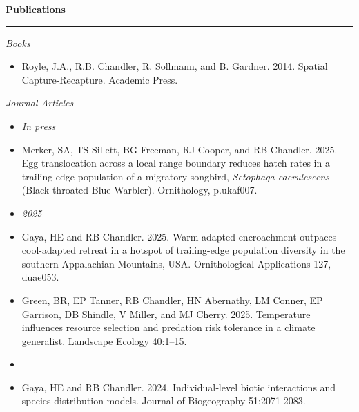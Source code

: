 \documentclass[12pt]{article}
\begin{document}
\vspace{0.5cm}

{\large \bf Publications} \\
\rule[3mm]{\textwidth}{0.3mm}

\emph{Books}
\begin{itemize}

\item Royle, J.A., R.B. Chandler, R. Sollmann, and B. Gardner. 2014. Spatial
Capture-Recapture. Academic Press. 

\end{itemize}

\vspace{0.5cm}

\emph{Journal Articles}

\begin{itemize}

\item[] {\centering \it In press \\}

\item Merker, SA, TS Sillett, BG Freeman, RJ Cooper, and RB
  Chandler. 2025. Egg translocation across a local range
  boundary reduces hatch rates in a trailing-edge population of a
  migratory songbird, {\it Setophaga caerulescens} (Black-throated Blue
  Warbler). Ornithology, p.ukaf007.  
  
\item[] {\centering \it 2025 \\}

\item Gaya, HE and RB Chandler. 2025. Warm-adapted encroachment 
  outpaces cool-adapted retreat in a hotspot of trailing-edge
  population diversity in the southern Appalachian Mountains, USA.
  Ornithological Applications 127, duae053. 
  
\item Green, BR, EP Tanner, RB Chandler, HN Abernathy, LM Conner, EP
  Garrison, DB Shindle, V Miller, and MJ Cherry. 2025. Temperature
  influences resource selection and predation risk tolerance in a
  climate generalist. Landscape Ecology 40:1--15. 

  
\item[] { \\}

\item Gaya, HE and RB Chandler. 2024. Individual‐level biotic
  interactions and species distribution models. Journal of
  Biogeography 51:2071-2083.


\end{itemize}
\end{document}
